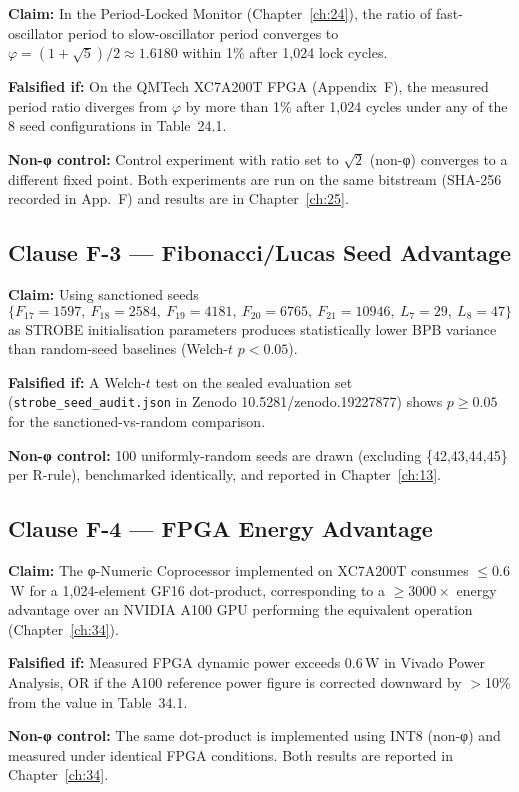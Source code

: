 \begin{tcolorbox}[colback=red!5,colframe=red!40,title=Falsifier F-2]
\textbf{Claim:} In the Period-Locked Monitor (Chapter~\ref{ch:24}), the ratio of
fast-oscillator period to slow-oscillator period converges to
\(\varphi = (1+\sqrt{5})/2 \approx 1.6180\) within 1\% after 1,024 lock cycles.

\textbf{Falsified if:} On the QMTech XC7A200T FPGA (Appendix~F), the measured
period ratio diverges from \(\varphi\) by more than 1\% after 1,024 cycles
under any of the 8 seed configurations in Table~24.1.

\textbf{Non-φ control:} Control experiment with ratio set to \(\sqrt{2}\)
(non-φ) converges to a different fixed point. Both experiments are run on the
same bitstream (SHA-256 recorded in App.~F) and results are in Chapter~\ref{ch:25}.
\end{tcolorbox}

\subsection*{Clause F-3 — Fibonacci/Lucas Seed Advantage}

\begin{tcolorbox}[colback=red!5,colframe=red!40,title=Falsifier F-3]
\textbf{Claim:} Using sanctioned seeds
\[\{F_{17}{=}1597,\ F_{18}{=}2584,\ F_{19}{=}4181,\ F_{20}{=}6765,\ F_{21}{=}10946,\ L_7{=}29,\ L_8{=}47\}\]
as STROBE initialisation parameters produces statistically lower BPB variance
than random-seed baselines (Welch-$t$ $p < 0.05$).

\textbf{Falsified if:} A Welch-$t$ test on the sealed evaluation set
(\texttt{strobe\_seed\_audit.json} in Zenodo 10.5281/zenodo.19227877) shows
$p \geq 0.05$ for the sanctioned-vs-random comparison.

\textbf{Non-φ control:} 100 uniformly-random seeds are drawn (excluding
\{42,43,44,45\} per R-rule), benchmarked identically, and reported in
Chapter~\ref{ch:13}.
\end{tcolorbox}

\subsection*{Clause F-4 — FPGA Energy Advantage}

\begin{tcolorbox}[colback=red!5,colframe=red!40,title=Falsifier F-4]
\textbf{Claim:} The φ-Numeric Coprocessor implemented on XC7A200T consumes
$\leq 0.6$\,W for a 1,024-element GF16 dot-product, corresponding to a
$\geq 3000\times$ energy advantage over an NVIDIA A100 GPU performing the
equivalent operation (Chapter~\ref{ch:34}).

\textbf{Falsified if:} Measured FPGA dynamic power exceeds 0.6\,W in Vivado
Power Analysis, OR if the A100 reference power figure is corrected downward
by $>$10\% from the value in Table~34.1.

\textbf{Non-φ control:} The same dot-product is implemented using INT8
(non-φ) and measured under identical FPGA conditions. Both results are
reported in Chapter~\ref{ch:34}.
\end{tcolorbox}


